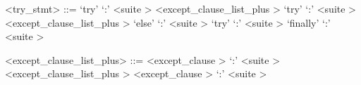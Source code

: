 \begin{grammar}
<try_stmt> ::= `try' `:' <suite \myref[suiteb]> <except_clause_list_plus \myref[exceptzzzclausezzzlistzzzplusb]>
	\alt `try' `:' <suite \myref[suiteb]> <except_clause_list_plus \myref[exceptzzzclausezzzlistzzzplusb]> `else' `:' <suite \myref[suiteb]>
	\alt `try' `:' <suite \myref[suiteb]> `finally' `:' <suite \myref[suiteb]>
\end{grammar}


\label{exceptzzzclausezzzlistzzzplusb}

\begin{grammar}
<except_clause_list_plus> ::= <except_clause \myref[exceptzzzclauseb]> `:' <suite \myref[suiteb]>
	\alt <except_clause_list_plus \myref[exceptzzzclausezzzlistzzzplusb]> <except_clause \myref[exceptzzzclauseb]> `:' <suite \myref[suiteb]>
\end{grammar}


